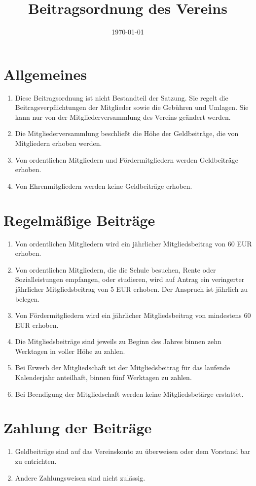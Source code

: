 \documentclass[12pt,a4paper,draft]{article}
\title{Beitragsordnung des Vereins \unsername}
\author{\unsername}
\date{\today}
\begin{document}
\maketitle
\tableofcontents

\section{Allgemeines}
\begin{enumerate}
\item Diese Beitragsordnung ist nicht Bestandteil der Satzung. Sie regelt die 
Beitragsverpflichtungen der Mitglieder sowie die Gebühren und Umlagen. Sie kann 
nur von der Mitgliederversammlung des Vereins geändert werden.

\item Die Mitgliederversammlung beschließt die Höhe der Geldbeiträge, die von 
Mitgliedern erhoben werden.

\item Von ordentlichen Mitgliedern und Fördermitgliedern werden Geldbeiträge 
erhoben.

\item Von Ehrenmitgliedern werden keine Geldbeiträge erhoben.
\end{enumerate}

\section{Regelmäßige Beiträge}
\begin{enumerate}
\item Von ordentlichen Mitgliedern wird ein jährlicher Mitgliedsbeitrag von 60 
EUR erhoben.

\item Von ordentlichen Mitgliedern, die die Schule besuchen, Rente oder 
Sozialleistungen empfangen, oder studieren, wird auf Antrag ein veringerter 
jährlicher Mitgliedsbeitrag von 5 EUR erhoben. Der Anspruch ist jährlich zu 
belegen.

\item Von Fördermitgliedern wird ein jährlicher Mitgliedsbeitrag von mindestens 
60 EUR erhoben.

\item Die Mitgliedsbeiträge sind jeweils zu Beginn des Jahres binnen zehn 
Werktagen in voller Höhe zu zahlen.

\item Bei Erwerb der Mitgliedschaft ist der Mitgliedsbeitrag für das laufende 
Kalenderjahr anteilhaft, binnen fünf Werktagen zu zahlen.

\item Bei Beendigung der Mitgliedschaft werden keine Mitgliedsbetärge erstattet.
\end{enumerate}

\section{Zahlung der Beiträge}
\begin{enumerate}
\item Geldbeiträge sind auf das Vereinskonto zu überweisen oder dem Vorstand 
bar zu entrichten.

\item Andere Zahlungsweisen sind nicht zulässig.
\end{enumerate}
\end{document}
